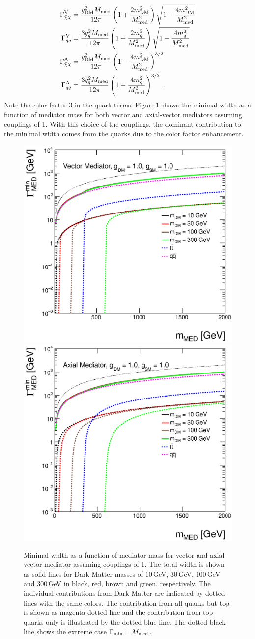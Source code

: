 \begin{align}
\Gamma_{\bar{\chi}\chi}^{\rm{V}}&=\frac{\gDM^2 \mMed}{12\pi}\left(1+\frac{2 \mDM^2}{\mMed^2} \right)\sqrt{1-\frac{4 \mDM^2}{\mMed^2}}\\
\Gamma_{\bar{q}q}^{\rm{V}}&= \frac{3 \gq^2 \mMed}{12\pi}\left(1+\frac{2 m_q^2}{\mMed^2} \right)\sqrt{1-\frac{4 m_q^2}{\mMed^2}}\\
\Gamma_{\bar{\chi}\chi}^{\rm{A}}&=\frac{\gDM^2 \mMed}{12\pi} \left(1-\frac{4 \mDM^2}{\mMed^2}\right)^{3/2}\\
\Gamma_{\bar{q}q}^{\rm{A}}&= \frac{3 \gq^2 \mMed}{12\pi}\left(1-\frac{4 m_q^2}{\mMed^2}\right)^{3/2}\label{eq:Gamma4}\;.
\end{align}
Note the color factor 3 in the quark terms.
Figure\,\ref{fig:monojet_width_V} shows the minimal width as a function of mediator mass for both vector and axial-vector mediators assuming couplings of 1. With this choice of the couplings, the dominant contribution to the minimal width comes from the quarks due to the color factor enhancement.

\begin{figure}
\centering
\includegraphics[width=0.45\linewidth]{figures/monojet/width_V.eps}
\includegraphics[width=0.45\linewidth]{figures/monojet/width_A.eps}
\caption{Minimal width as a function of mediator mass for vector and axial-vector mediator assuming couplings of 1. The total width is shown as solid lines for Dark Matter masses of 10\,GeV, 30\,GeV, 100\,GeV and 300\,GeV in black, red, brown and green, respectively. The individual contributions from Dark Matter are indicated by dotted lines with the same colors. The contribution from all quarks but top is shown as magenta dotted line and the contribution from top quarks only is illustrated by the dotted blue line. The dotted black line shows the extreme case $\Gamma_{\rm{min}}=M_{\rm{med}}$.}
\label{fig:monojet_width_V}
\end{figure}

